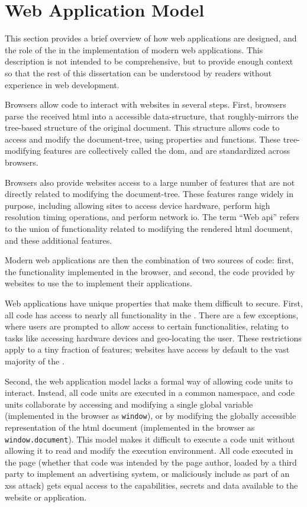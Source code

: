\section{Web Application Model}
\label{background:web-application-model}

This section provides a brief overview of how web applications are designed,
and the role of the \WAPI in the implementation of modern web applications.
This description is not intended to be comprehensive, but to provide enough
context so that the rest of this dissertation can be understood
by readers without experience in web development.

Browsers allow \JS code to interact with websites in several steps. First,
browsers parse the received \gls{html} into a \JS accessible data-structure,
that roughly-mirrors the tree-based structure of the original document.
This structure allows \JS code to access and modify the document-tree,
using \JS properties and functions.  These tree-modifying \JS features are
collectively called the \gls{dom}, and are standardized across browsers.

Browsers also provide websites access to a large number of \JS features
that are not directly related to modifying the document-tree.  These
features range widely in purpose, including allowing sites to
access device hardware, perform high resolution timing operations, and
perform network \gls{io}.  The term ``Web \gls{api}'' refers to the union of
functionality related to modifying the rendered \gls{html} document, and
these additional \JS features.

Modern web applications are then the combination of two sources of code:
first, the \WAPI functionality implemented in the browser, and second,
the \JS code provided by websites to use the \WAPI to implement their
applications.

Web applications have unique properties that make them difficult to secure.
First, all \JS code has access to nearly all functionality in the \WAPI.
There are a few exceptions, where users are
prompted to allow access to certain functionalities, relating
to tasks like accessing hardware devices and geo-locating the user.  These
restrictions apply to a tiny fraction of features; websites have
access by default to the vast majority of the \WAPI.

Second, the web application model lacks a formal
way of allowing code units to interact.  Instead, all code units are
executed in a common namespace, and code units collaborate by accessing and
modifying a single global variable (implemented in the browser as
\texttt{window}), or by modifying the globally accessible representation of the
\gls{html} document (implemented in the browser as \texttt{window.document}).
This model makes it difficult to execute a code unit without allowing
it to read and modify the execution environment.  All code executed in the
page (whether that code was intended by the page author, loaded by a third
party to implement an advertising system, or maliciously include as part of
an \gls{xss} attack) gets equal access to the capabilities, secrets and data
available to the website or application.

